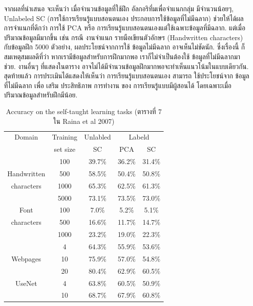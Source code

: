 จากผลที่นำเสนอ จะเห็นว่า เมื่อจำนวนข้อมูลที่ใช้ฝึก อัลกอริทึ่มเพื่อจำแนกกลุ่ม มีจำนวนน้อยๆ, Unlabeled SC (การใช้การเรียนรู้แบบสอนตนเอง ประกอบการใช้ข้อมูลที่ไม่มีฉลาก) ช่วยให้ได้ผลการจำแนกที่ดีกว่า การใช้ PCA หรือ การเรียนรู้แบบสอนตนเองแต่ใช้เฉพาะข้อมูลที่มีฉลาก.
แต่เมื่อปริมาณข้อมูลมีมากขึ้น เช่น กรณี งานจำแนก รายมือเขียนตัวอักษร (Handwritten characters) กับข้อมูลฝึก 5000 ตัวอย่าง, 
ผลประโยชน์จากการใช้ ข้อมูลไม่มีฉลาก อาจเห็นไม่ชัดนัก.
ซึ่งเรื่องนี้ ก็สมเหตุสมผลดีที่ว่า หากเรามีข้อมูลสำหรับการฝึกมากพอ เราก็ไม่จำเป็นต้องใช้ ข้อมูลที่ไม่มีฉลากมาช่วย.
งานอื่นๆ ที่แสดงในตาราง อาจไม่ได้มีจำนวนข้อมูลฝึกมากพอจะทำเห็นแนวโน้มในแบบเดียวกัน.
%
สุดท้ายแล้ว การประเมินได้แสดงให้เห็นว่า การเรียนรู้แบบสอนตนเอง สามารถ ใช้ประโยชน์จาก ข้อมูลที่ไม่มีฉลาก เพื่อ เสริม ประสิทธิภาพ การทำงาน ของ การเรียนรู้แบบมีผู้สอนได้ โดยเฉพาะเมื่อ ปริมาณข้อมูลสำหรับฝึกมีน้อย.

%
\begin{table}[hbtp]
\caption{Accuracy on the self-taught learning tasks (ตารางที่ 7 ใน Raina et al 2007)}
\begin{center}
\begin{tabular}{|c|c|c|c|c|}
\hline
Domain & Training & Unlabled & \multicolumn{2}{c|}{Labeld} \\
\cline{4-5}
       & set size & SC       & PCA  & SC \\
\hline
              & 100  & 39.7\% & 36.2\% & 31.4\% \\
Handwritten   & 500  & 58.5\% & 50.4\% & 50.8\% \\
characters    & 1000 & 65.3\% & 62.5\% & 61.3\% \\
              & 5000 & 73.1\% & 73.5\% & 73.0\% \\
\hline
Font          & 100  & 7.0\%  & 5.2\%  & 5.1\% \\
characters    & 500  & 16.6\% & 11.7\% & 14.7\% \\
              & 1000 & 23.2\% & 19.0\% & 22.3\% \\
\hline
              & 4    & 64.3\% & 55.9\% & 53.6\% \\
Webpages      & 10   & 75.9\% & 57.0\% & 54.8\% \\
              & 20   & 80.4\% & 62.9\% & 60.5\% \\
\hline
UseNet 	      & 4    & 63.8\% & 60.5\% & 50.9\% \\
              & 10   & 68.7\% & 67.9\% & 60.8\% \\
\hline
\end{tabular} 
\end{center}
\label{tbl: deep Raina et al 2007 results}
\end{table}

